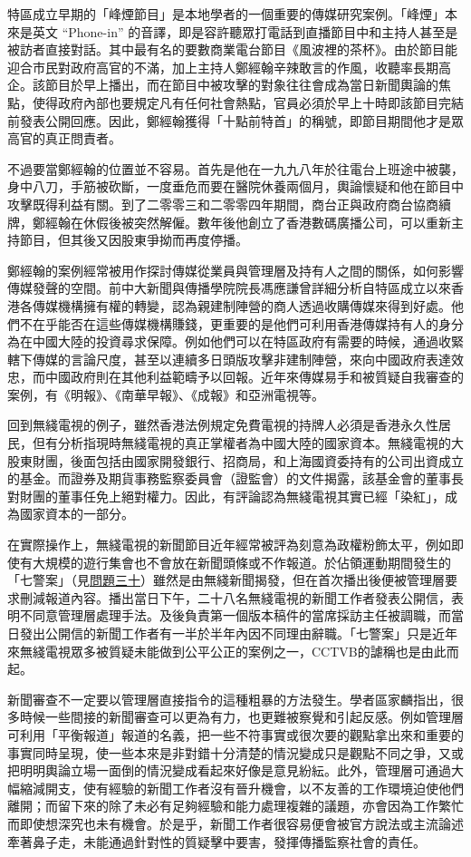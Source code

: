 特區成立早期的「峰煙節目」是本地學者的一個重要的傳媒研究案例。「峰煙」本來是英文 “Phone-in” 的音譯，即是容許聽眾打電話到直播節目中和主持人甚至是被訪者直接對話。其中最有名的要數商業電台節目《風波裡的茶杯》。由於節目能迎合市民對政府高官的不滿，加上主持人鄭經翰辛辣敢言的作風，收聽率長期高企。該節目於早上播出，而在節目中被攻擊的對象往往會成為當日新聞輿論的焦點，使得政府內部也要規定凡有任何社會熱點，官員必須於早上十時即該節目完結前發表公開回應。因此，鄭經翰獲得「十點前特首」的稱號，即節目期間他才是眾高官的真正問責者。

不過要當鄭經翰的位置並不容易。首先是他在一九九八年於往電台上班途中被襲，身中八刀，手筋被砍斷，一度垂危而要在醫院休養兩個月，輿論懷疑和他在節目中攻擊既得利益有關。到了二零零三和二零零四年期間，商台正與政府商台協商續牌，鄭經翰在休假後被突然解僱。數年後他創立了香港數碼廣播公司，可以重新主持節目，但其後又因股東爭拗而再度停播。

鄭經翰的案例經常被用作探討傳媒從業員與管理層及持有人之間的關係，如何影響傳媒發聲的空間。前中大新聞與傳播學院院長馮應謙曾詳細分析自特區成立以來香港各傳媒機構擁有權的轉變，認為親建制陣營的商人透過收購傳媒來得到好處。他們不在乎能否在這些傳媒機構賺錢，更重要的是他們可利用香港傳媒持有人的身分為在中國大陸的投資尋求保障。例如他們可以在特區政府有需要的時候，通過收緊轄下傳媒的言論尺度，甚至以連續多日頭版攻擊非建制陣營，來向中國政府表達效忠，而中國政府則在其他利益範疇予以回報。近年來傳媒易手和被質疑自我審查的案例，有《明報》、《南華早報》、《成報》和亞洲電視等。

回到無綫電視的例子，雖然香港法例規定免費電視的持牌人必須是香港永久性居民，但有分析指現時無綫電視的真正掌權者為中國大陸的國家資本。無綫電視的大股東財團，後面包括由國家開發銀行、招商局，和上海國資委持有的公司出資成立的基金。而證券及期貨事務監察委員會（證監會）的文件揭露，該基金會的董事長對財團的董事任免上絕對權力。因此，有評論認為無綫電視其實已經「染紅」，成為國家資本的一部分。

在實際操作上，無綫電視的新聞節目近年經常被評為刻意為政權粉飾太平，例如即使有大規模的遊行集會也不會放在新聞頭條或不作報道。於佔領運動期間發生的「七警案」（見\hyperref[sec:sec30]{問題三十}）雖然是由無綫新聞揭發，但在首次播出後便被管理層要求刪減報道內容。播出當日下午，二十八名無綫電視的新聞工作者發表公開信，表明不同意管理層處理手法。及後負責第一個版本稿件的當席採訪主任被調職，而當日發出公開信的新聞工作者有一半於半年內因不同理由辭職。「七警案」只是近年來無綫電視眾多被質疑未能做到公平公正的案例之一，CCTVB的謔稱也是由此而起。

新聞審查不一定要以管理層直接指令的這種粗暴的方法發生。學者區家麟指出，很多時候一些間接的新聞審查可以更為有力，也更難被察覺和引起反感。例如管理層可利用「平衡報道」報道的名義，把一些不符事實或很次要的觀點拿出來和重要的事實同時呈現，使一些本來是非對錯十分清楚的情況變成只是觀點不同之爭，又或把明明輿論立場一面倒的情況變成看起來好像是意見紛紜。此外，管理層可通過大幅縮減開支，使有經驗的新聞工作者沒有晉升機會，以不友善的工作環境迫使他們離開；而留下來的除了未必有足夠經驗和能力處理複雜的議題，亦會因為工作繁忙而即使想深究也未有機會。於是乎，新聞工作者很容易便會被官方說法或主流論述牽著鼻子走，未能通過針對性的質疑擊中要害，發揮傳播監察社會的責任。

